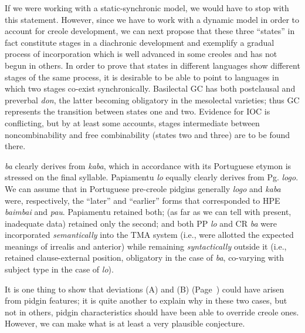If we were working with a static-synchronic model, we would have to stop with this statement. However, since we have to work with a dynamic model in order to account for creole development, we can next propose that these three ``states'' in fact constitute stages in a diachronic development and exemplify a gradual process of incorpora\-tion which is well advanced in some creoles and has not begun in others. In order to prove that states in different languages show differ\-ent stages of the same process, it is desirable to be able to point to languages in which two stages co-exist synchronically. Basilectal GC has both postclausal and preverbal \textit{don}, the latter becoming obligatory in the mesolectal varieties; thus GC represents the transition between states one and two. Evidence for IOC is conflicting, but by at least
some accounts, stages intermediate between noncombinability and free combinability (states two and three) are to be found there.

 \textit{ba} clearly derives from \textit{kaba}, which in accordance with its Portuguese etymon is stressed on the final syllable. Papiamentu \textit{lo} equally clearly derives from Pg. \textit{logo}. We can assume that in Portuguese pre-creole pidgins generally \textit{logo} and \textit{kaba} were, respectively, the ``later'' and ``earlier'' forms that corresponded to HPE \textit{baimbai} and \textit{pau}. Papiamentu retained both;  (as far as we can tell with present, inadequate data) retained only the second; and both PP \textit{lo} and CR \textit{ba} were incorporated \textit{semantically} into the TMA system (i.e., were allotted the expected meanings of irrealis and anterior) while remaining \textit{syntactically} outside it (i.e., retained clause-external position, obligatory in the case of \textit{ba}, co-varying with subject type in the case of \textit{lo}).

It is one thing to show that deviations (A) and (B) (Page~\pageref{majordeviations}) could have arisen from pidgin features; it is quite another to explain why in these two cases, but not in others, pidgin characteristics should have been able to override creole ones. However, we can make what is at least a very plausible conjecture.


